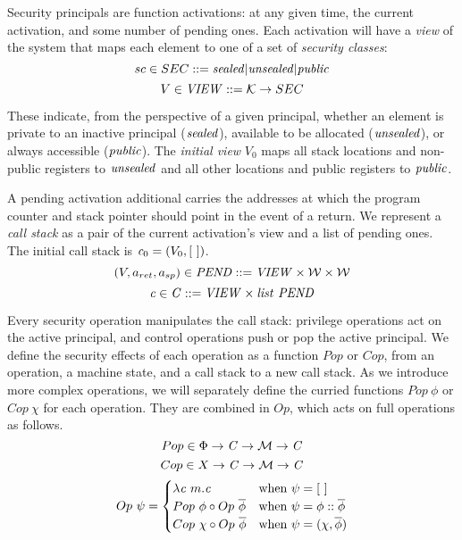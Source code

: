 \documentclass[10pt,conference]{ieeetran}%
\theoremstyle{definition}
\begin{document}
Security principals are function activations: at any given time, the current
activation, and some number of pending ones. Each activation will have a {\it view}
of the system that maps each element to one of a set of {\it security classes}:
\[sc \in SEC ::= \mathit{sealed} | \mathit{unsealed} | \mathit{public}\]
\[V \in \mathit{VIEW} ::= {\mathcal K} \rightarrow SEC\]

These indicate, from the perspective of a given principal, whether an element is
private to an inactive principal (\(\mathit{sealed}\)),
available to be allocated (\(\mathit{unsealed}\)), or
always accessible (\(\mathit{public}\)).
The {\it initial view} \(V_0\) maps all stack locations and non-public registers
to \(\mathit{unsealed}\) and all other locations and public registers to \(\mathit{public}\).

A pending activation additional carries the addresses at which the program counter
and stack pointer should point in the event of a return.
We represent a {\it call stack} as a pair of the current activation's view
and a list of pending ones.
The initial call stack is \(\mathit{c}_0 = (V_0, [ ~ ])\).
\[(V, a_{ret}, a_{sp}) \in \mathit{PEND} ::= \mathit{VIEW \times {\mathcal W} \times {\mathcal W}}\]
\[\mathit{c} \in \mathit{C} ::= \mathit{VIEW \times list ~ PEND}\]

Every security operation manipulates the call stack: privilege operations act on
the active principal, and control operations push or pop the active principal.
We define the security effects of each operation as a function \(Pop\) or \(Cop\),
from an operation, a machine state, and a call stack to a new call stack.
As we introduce more complex operations, we will separately define
the curried functions \(Pop ~ \phi\) or \(Cop ~ \chi\) for each operation.
They are combined in \(Op\), which acts on full operations as follows.
\[Pop \in \Phi \rightarrow \mathit{C} \rightarrow {\mathcal M} \rightarrow \mathit{C}\]
\[Cop \in X \rightarrow \mathit{C} \rightarrow {\mathcal M} \rightarrow \mathit{C}\]
\[Op ~ \psi =
\begin{cases}
  \lambda \mathit{c} ~ m . \mathit{c} & \textnormal{when } \psi = [~] \\
  Pop ~ \phi \circ Op ~ \overline{\phi} & \textnormal{when } \psi = \phi::\overline{\phi} \\
  Cop ~ \chi \circ Op ~ \overline{\phi} & \textnormal{when } \psi = (\chi,\overline{\phi}) \\
\end{cases}\]
\end{document}
